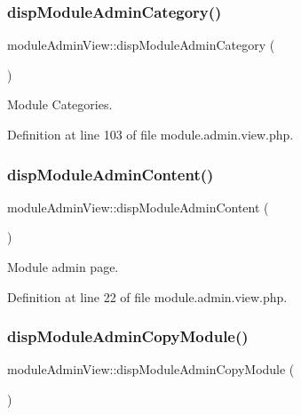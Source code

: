 \subsubsection{\texorpdfstring{disp\+Module\+Admin\+Category()}{dispModuleAdminCategory()}}
{\footnotesize\ttfamily module\+Admin\+View\+::disp\+Module\+Admin\+Category (\begin{DoxyParamCaption}{ }\end{DoxyParamCaption})}



Module Categories. 



Definition at line 103 of file module.\+admin.\+view.\+php.

\hypertarget{classmoduleAdminView_a1b5edba3a516dd443b323743330ded45}{}\label{classmoduleAdminView_a1b5edba3a516dd443b323743330ded45} 
\subsubsection{\texorpdfstring{disp\+Module\+Admin\+Content()}{dispModuleAdminContent()}}
{\footnotesize\ttfamily module\+Admin\+View\+::disp\+Module\+Admin\+Content (\begin{DoxyParamCaption}{ }\end{DoxyParamCaption})}



Module admin page. 



Definition at line 22 of file module.\+admin.\+view.\+php.

\hypertarget{classmoduleAdminView_aa9846c36dd6d640677eb6c9ac237e28f}{}\label{classmoduleAdminView_aa9846c36dd6d640677eb6c9ac237e28f} 
\subsubsection{\texorpdfstring{disp\+Module\+Admin\+Copy\+Module()}{dispModuleAdminCopyModule()}}
{\footnotesize\ttfamily module\+Admin\+View\+::disp\+Module\+Admin\+Copy\+Module (\begin{DoxyParamCaption}{ }\end{DoxyParamCaption})}



